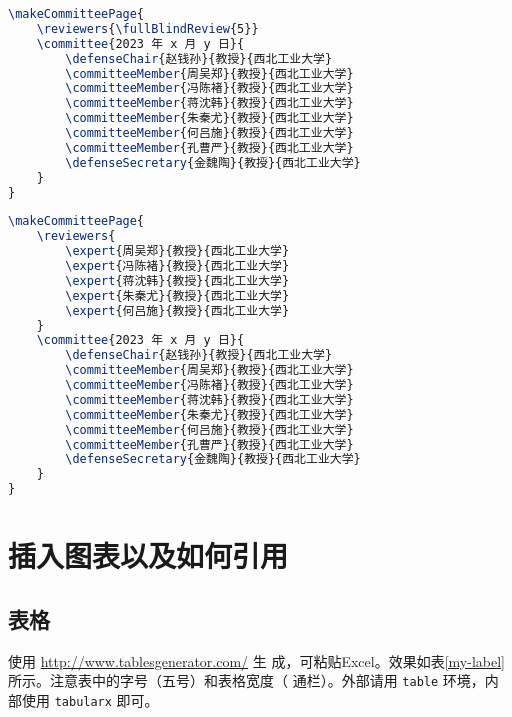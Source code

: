 \documentclass[lang=chs, degree=phd, blindreview=false, winfonts=true]{yanputhesis}
\begin{document}
\begin{lstlisting}[language={TeX}, label={code:makeBlindReviewerCommitteePage},
    caption={盲评样例 makeBlindReviewerCommitteePage.tex}]
\makeCommitteePage{
    \reviewers{\fullBlindReview{5}}
    \committee{2023 年 x 月 y 日}{
        \defenseChair{赵钱孙}{教授}{西北工业大学}
        \committeeMember{周吴郑}{教授}{西北工业大学}
        \committeeMember{冯陈褚}{教授}{西北工业大学}
        \committeeMember{蒋沈韩}{教授}{西北工业大学}
        \committeeMember{朱秦尤}{教授}{西北工业大学}
        \committeeMember{何吕施}{教授}{西北工业大学}
        \committeeMember{孔曹严}{教授}{西北工业大学}
        \defenseSecretary{金魏陶}{教授}{西北工业大学}
    }
}
\end{lstlisting}

\begin{lstlisting}[language={TeX}, label={code:makeOpenReviewerCommitteePage},
    caption={明审样例 makeOpenReviewerCommitteePage.tex}]
\makeCommitteePage{
    \reviewers{
        \expert{周吴郑}{教授}{西北工业大学}
        \expert{冯陈褚}{教授}{西北工业大学}
        \expert{蒋沈韩}{教授}{西北工业大学}
        \expert{朱秦尤}{教授}{西北工业大学}
        \expert{何吕施}{教授}{西北工业大学}
    }
    \committee{2023 年 x 月 y 日}{
        \defenseChair{赵钱孙}{教授}{西北工业大学}
        \committeeMember{周吴郑}{教授}{西北工业大学}
        \committeeMember{冯陈褚}{教授}{西北工业大学}
        \committeeMember{蒋沈韩}{教授}{西北工业大学}
        \committeeMember{朱秦尤}{教授}{西北工业大学}
        \committeeMember{何吕施}{教授}{西北工业大学}
        \committeeMember{孔曹严}{教授}{西北工业大学}
        \defenseSecretary{金魏陶}{教授}{西北工业大学}
    }
}
\end{lstlisting}

\cleardoublepage

\chapter{插入图表以及如何引用}

\section{表格}

使用 \href{http://www.tablesgenerator.com/}{http://www.tablesgenerator.com/} 生
成，可粘贴Excel。效果如表\ref{my-label}所示。注意表中的字号（五号）和表格宽度（
通栏）。外部请用 \lstinline`table` 环境，内部使用 \lstinline`tabularx` 即可。
\end{document}
